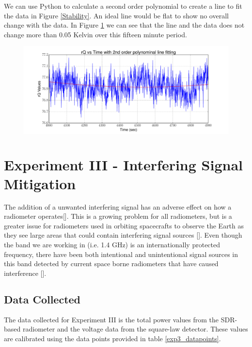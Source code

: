 {We can use Python to calculate a second order polynomial to create a line to fit the data in Figure \ref{Stability}.  An ideal line would be flat to show no overall change with the data.  In Figure \ref{Stability_calib} we can see that the line and the data does not change more than 0.05 Kelvin over this fifteen minute period.

\begin{figure}[h!tb] \centering
\includegraphics[width=\textwidth]{Experiments/Exp2/calib_line_fitting.pdf}
\label{Stability_calib}
\end{figure}

\section{Experiment III - Interfering Signal Mitigation} \label{Exp3_results}

The addition of a unwanted interfering signal has an adverse effect on how a radiometer operates[\cite{Ellingson}].  This is a growing problem for all radiometers, but is a greater issue for radiometers used in orbiting spacecrafts to observe the Earth as they see large areas that could contain interfering signal sources [\cite{DeRooRFI}].  Even though the band we are working in (i.e. 1.4 GHz) is an internationally protected frequency, there have been both intentional and unintentional signal sources in this band detected by current space borne radiometers that have caused interference [\cite{Forte}].

\subsection{Data Collected}

The data collected for Experiment III is the total power values from the SDR-based radiometer and the voltage data from the square-law detector.  These values are calibrated using the data points provided in table \ref{exp3_datapoints}.

}
